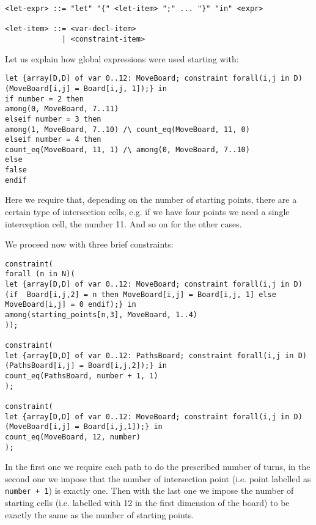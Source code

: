 \begin{verbatim}
<let-expr> ::= "let" "{" <let-item> ";" ... "}" "in" <expr>

<let-item> ::= <var-decl-item>
             | <constraint-item>
\end{verbatim}

Let us explain how global expressions were used starting with:

\begin{verbatim}
let {array[D,D] of var 0..12: MoveBoard; constraint forall(i,j in D) (MoveBoard[i,j] = Board[i,j, 1]);} in
if number = 2 then
among(0, MoveBoard, 7..11)
elseif number = 3 then
among(1, MoveBoard, 7..10) /\ count_eq(MoveBoard, 11, 0)
elseif number = 4 then
count_eq(MoveBoard, 11, 1) /\ among(0, MoveBoard, 7..10) 
else
false 
endif
\end{verbatim}
Here we require that, depending on the number of starting points, there are a certain type of intersection cells, e.g. if we have four points we need a single interception cell, the number 11.
And so on for the other cases.

We proceed now with three brief constraints:
\begin{verbatim}
constraint(
forall (n in N)(
let {array[D,D] of var 0..12: MoveBoard; constraint forall(i,j in D) (if  Board[i,j,2] = n then MoveBoard[i,j] = Board[i,j, 1] else MoveBoard[i,j] = 0 endif);} in
among(starting_points[n,3], MoveBoard, 1..4)
));

constraint(
let {array[D,D] of var 0..12: PathsBoard; constraint forall(i,j in D) (PathsBoard[i,j] = Board[i,j,2]);} in
count_eq(PathsBoard, number + 1, 1)
);

constraint(
let {array[D,D] of var 0..12: MoveBoard; constraint forall(i,j in D) (MoveBoard[i,j] = Board[i,j,1]);} in
count_eq(MoveBoard, 12, number)
);
    \end{verbatim}

In the first one we require each path to do the prescribed number of turns, in the second one we impose that the number of intersection point (i.e. point labelled as \texttt{number + 1}) is exactly one. Then with the last one we impose the number of starting cells (i.e. labelled with 12 in the first dimension of the board) to be exactly the same as the number of starting points.
